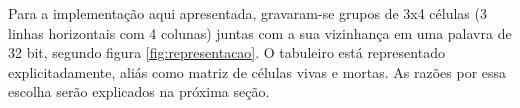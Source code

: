 Para a implementação aqui apresentada, gravaram-se grupos de 3x4 células (3 linhas horizontais com 4 colunas) juntas com a sua vizinhança em uma palavra de 32 bit, segundo figura \ref{fig:representacao}. O tabuleiro está representado explicitadamente, aliás como matriz de células vivas e mortas. As razões por essa escolha serão explicados na próxima seção.

